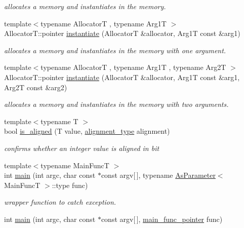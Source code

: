 \begin{DoxyCompactItemize}
\begin{DoxyCompactList}\small\item\em allocates a memory and instantiates in the memory. \end{DoxyCompactList}\item 
{\footnotesize template$<$typename Allocator\-T , typename Arg1\-T $>$ }\\Allocator\-T\-::pointer \hyperlink{namespacehryky_a02b5dc8e5806eb5545fa209d700b7f11}{instantiate} (Allocator\-T \&allocator, Arg1\-T const \&arg1)
\begin{DoxyCompactList}\small\item\em allocates a memory and instantiates in the memory with one argument. \end{DoxyCompactList}\item 
{\footnotesize template$<$typename Allocator\-T , typename Arg1\-T , typename Arg2\-T $>$ }\\Allocator\-T\-::pointer \hyperlink{namespacehryky_a0456c0aabb3bf6ffab33cb74f490761a}{instantiate} (Allocator\-T \&allocator, Arg1\-T const \&arg1, Arg2\-T const \&arg2)
\begin{DoxyCompactList}\small\item\em allocates a memory and instantiates in the memory with two arguments. \end{DoxyCompactList}\item 
{\footnotesize template$<$typename T $>$ }\\bool \hyperlink{namespacehryky_abb8da7a8ab9766df31c47826f2bf1a40}{is\-\_\-aligned} (T value, \hyperlink{namespacehryky_aee1af251193c2d308aaa68ef7e36a540}{alignment\-\_\-type} alignment)
\begin{DoxyCompactList}\small\item\em confirms whether an integer value is aligned in bit \end{DoxyCompactList}\item 
{\footnotesize template$<$typename Main\-Func\-T $>$ }\\int \hyperlink{namespacehryky_acf43d20e6c0b5e4b54931d42b46443a1}{main} (int argc, char const $\ast$const argv\mbox{[}$\,$\mbox{]}, typename \hyperlink{classhryky_1_1_as_parameter}{As\-Parameter}$<$ Main\-Func\-T $>$\-::type func)
\begin{DoxyCompactList}\small\item\em wrapper function to catch exception. \end{DoxyCompactList}\item 
int \hyperlink{namespacehryky_a67f55b393c526ea5965bc45873f9fd88}{main} (int argc, char const $\ast$const argv\mbox{[}$\,$\mbox{]}, \hyperlink{namespacehryky_a9135850015ed231a278a8871bef3d80e}{main\-\_\-func\-\_\-pointer} func)

\end{DoxyCompactItemize}
